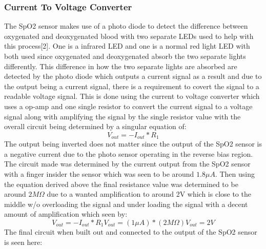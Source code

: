 \documentclass{article}
\begin{document}
\subsubsection{Current To Voltage Converter}
The SpO2 sensor makes use of a photo diode to detect the difference between oxygenated and deoxygenated blood with two separate LEDs used to help with this process[2]. One is a infrared LED and one is a normal red light LED with both used since oxygenated and deoxygenated absorb the two separate lights differently. This difference in how the two separate lights are absorbed are detected by the photo diode which outputs a current signal as a result and due to the output being a current signal, there is a requirement to covert the signal to a readable voltage signal. This is done using the current to voltage converter which uses a op-amp and one single resistor to convert the current signal to a voltage signal along with amplifying the signal by the single resistor value with the overall circuit being determined by a singular equation of:
\begin{equation}
     V_{out} = -I_{out}*R_{1}
\end{equation}
The output being inverted does not matter since the output of the SpO2 sensor is a negative current due to the photo sensor operating in the reverse bias region. The circuit made was determined by the current output from the SpO2 sensor with a finger insider the sensor which was seen to be around $1.8\mu A$. Then using the equation derived above the final resistance value was determined to be around $2M\Omega$ due to a wanted amplification to around 2V which is close to the middle w/o overloading the signal and under loading the signal with a decent amount of amplification which seen by:
\begin{equation}
    V_{out} = -I_{out}*R_{1}
    V_{out} = (1\mu A)*(2M\Omega)
    V_{out} = 2V
\end{equation}
\newpage
The final circuit when built out and connected to the output of the SpO2 sensor is seen here:
\end{document}
